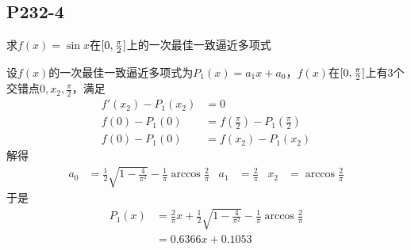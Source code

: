 \subsection{P232-4}
\renewcommand{\FX}{\sin x}
\renewcommand{\LRANGE}{0}
\renewcommand{\RRANGE}{\frac{\pi}{2}}
求$f(x) = \sin{x}$在$\RANGE$上的一次最佳一致逼近多项式
\begin{SOLVE}
设$f(x)$的一次最佳一致逼近多项式为$P_1(x) = a_1 x + a_0$，$f(x)$在$\RANGE$上有3个交错点$\LRANGE, x_2, \RRANGE$，满足
\begin{align*}
f'(x_2) - P_1(x_2)        & = 0\\
f(\LRANGE) - P_1(\LRANGE) & = f(\RRANGE) - P_1(\RRANGE)\\
f(\LRANGE) - P_1(\LRANGE) & = f(x_2) - P_1(x_2)
\end{align*}
解得
\begin{align*}
a_0    & = \frac{1}{2} \sqrt{1-\frac{4}{\pi^2}} - \frac{1}{\pi} \arccos{\frac{2}{\pi}} &
a_1    & = \frac{2}{\pi} &
x_2    & = \arccos{\frac{2}{\pi}}
\end{align*}
于是
\begin{align*}
P_1(x) & = \frac{2}{\pi} x + \frac{1}{2} \sqrt{1-\frac{4}{\pi^2}} - \frac{1}{\pi} \arccos{\frac{2}{\pi}} \\
       & = 0.6366 x + 0.1053
\end{align*}
\end{SOLVE}